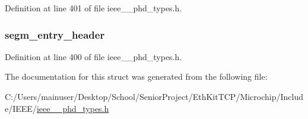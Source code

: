 Definition at line 401 of file ieee\+\_\+\_\+phd\+\_\+types.\+h.

\hypertarget{struct___pm_segment_entry_map_a8d43bfa723d4b36629caef6642bbeb56}{}
\subsubsection[{segm\+\_\+entry\+\_\+header}]{ segm\+\_\+entry\+\_\+header}\label{struct___pm_segment_entry_map_a8d43bfa723d4b36629caef6642bbeb56}


Definition at line 400 of file ieee\+\_\+\_\+phd\+\_\+types.\+h.



The documentation for this struct was generated from the following file\+:\begin{DoxyCompactItemize}
\item 
C\+:/\+Users/mainuser/\+Desktop/\+School/\+Senior\+Project/\+Eth\+Kit\+T\+C\+P/\+Microchip/\+Include/\+I\+E\+E\+E/\hyperlink{ieee__11073__phd__types_8h}{ieee\+\_\+\_\+phd\+\_\+types.\+h}\end{DoxyCompactItemize}
